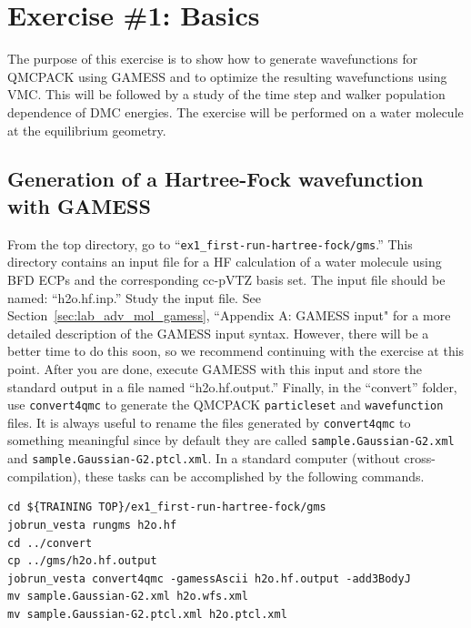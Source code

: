 \section{Exercise \#1: Basics}

The purpose of this exercise is to show how to generate wavefunctions for QMCPACK
using GAMESS and to optimize the resulting wavefunctions using VMC. This will be
followed by a study of the time step and walker population dependence of DMC energies.
The exercise will be performed on a water molecule at the equilibrium geometry.


\subsection{Generation of a Hartree-Fock wavefunction with GAMESS}

From the top directory, go to ``\texttt{ex1\_first-run-hartree-fock/gms}.'' This directory contains an input
file for a HF calculation of a water molecule using BFD ECPs and the corresponding
cc-pVTZ basis set. The input file should be named: “h2o.hf.inp.” Study the input
file. See Section~\ref{sec:lab_adv_mol_gamess}, ``Appendix A: GAMESS input" for a more detailed description of the
GAMESS input syntax. However, there will be a better time to do this soon, so we recommend
continuing with the exercise at this point. After you are done, execute
GAMESS with this input and store the standard output in a file named ``h2o.hf.output.''
Finally, in the ``convert'' folder, use \texttt{convert4qmc} to generate the QMCPACK \texttt{particleset} and \texttt{wavefunction} files. It
is always useful to rename the files generated by \texttt{convert4qmc} to something meaningful
since by default they are called \texttt{sample.Gaussian-G2.xml} and \texttt{sample.Gaussian-G2.ptcl.xml}.
In a standard computer (without cross-compilation), these tasks can be accomplished by
the following commands.
\begin{lstlisting}[style=SHELL]
cd ${TRAINING TOP}/ex1_first-run-hartree-fock/gms
jobrun_vesta rungms h2o.hf 
cd ../convert
cp ../gms/h2o.hf.output
jobrun_vesta convert4qmc -gamessAscii h2o.hf.output -add3BodyJ
mv sample.Gaussian-G2.xml h2o.wfs.xml
mv sample.Gaussian-G2.ptcl.xml h2o.ptcl.xml
\end{lstlisting}
\noindent

